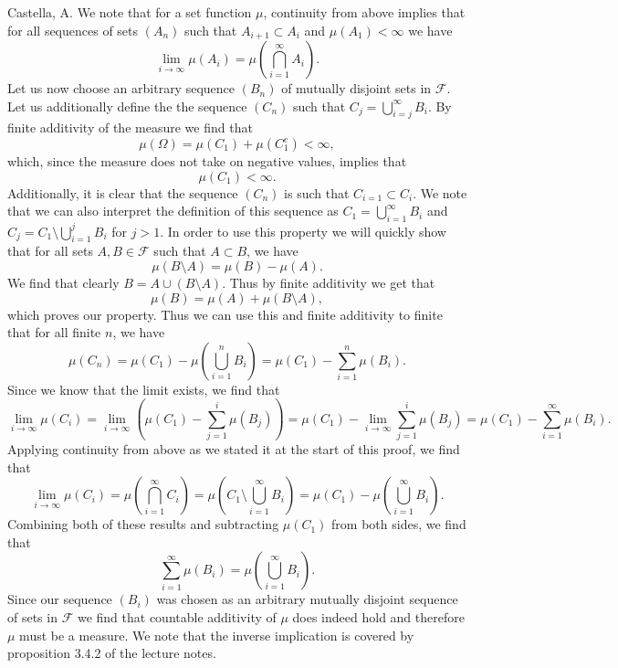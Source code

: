 \begin{solution}[3.15]{Castella, A.}
    We note that for a set function $\mu$, continuity from above implies that for all sequences of sets $(A_n)$ such that $A_{i+1} \subset A_i$ and $\mu(A_1) < \infty$ we have
    $$
        \lim_{i\rightarrow\infty}\mu(A_i) = \mu\left(\bigcap_{i=1}^\infty A_i\right).
    $$
    Let us now choose an arbitrary sequence $(B_n)$ of mutually disjoint sets in $\mathcal{F}$. Let us additionally define the the sequence $(C_n)$ such that $C_j = \bigcup_{i=j}^\infty B_i$. By finite additivity of the measure we find that
    $$
        \mu(\Omega) = \mu(C_1) + \mu(C_1^c) < \infty,
    $$
    which, since the measure does not take on negative values, implies that
    $$
        \mu(C_1) < \infty.
    $$
    Additionally, it is clear that the sequence $(C_n)$ is such that $C_{i=1} \subset C_{i}$. We note that we can also interpret the definition of this sequence as $C_1 = \bigcup_{i=1}^\infty B_i$ and $C_j = C_1 \setminus \bigcup_{i=1}^j B_i$ for $j > 1$. In order to use this property we will quickly show that for all sets $A,B \in \mathcal{F}$ such that $A \subset B$, we have
    $$
        \mu(B\setminus A) = \mu(B) - \mu(A).
    $$
    We find that clearly $B = A \cup (B\setminus A)$. Thus by finite additivity we get that
    $$
        \mu(B) = \mu(A) + \mu(B\setminus A),
    $$
    which proves our property. Thus we can use this and finite additivity to finite that for all finite $n$, we have
    $$
        \mu(C_n) = \mu(C_1) - \mu\left(\bigcup_{i=1}^n B_i\right) = \mu(C_1) - \sum_{i=1}^n\mu(B_i).
    $$
    Since we know that the limit exists, we find that
    $$
        \lim_{i\rightarrow\infty}\mu(C_i) = \lim_{i\rightarrow\infty}\left(\mu(C_1) - \sum_{j=1}^i \mu(B_j)\right) = \mu(C_1) - \lim_{i\rightarrow\infty}\sum_{j=1}^i\mu(B_j) = \mu(C_1) - \sum_{i=1}^\infty \mu(B_i).
    $$
    Applying continuity from above as we stated it at the start of this proof, we find that
    $$
        \lim_{i\rightarrow\infty}\mu(C_i) = \mu\left(\bigcap_{i=1}^\infty C_i\right) = \mu\left(C_1\setminus \bigcup_{i=1}^\infty B_i\right) = \mu(C_1) - \mu\left(\bigcup_{i=1}^\infty B_i\right).
    $$
    Combining both of these results and subtracting $\mu(C_1)$ from both sides, we find that
    $$
        \sum_{i=1}^\infty \mu(B_i) = \mu\left(\bigcup_{i=1}^\infty B_i\right).
    $$
    Since our sequence $(B_i)$ was chosen as an arbitrary mutually disjoint sequence of sets in $\mathcal{F}$ we find that countable additivity of $\mu$ does indeed hold and therefore $\mu$ must be a measure. We note that the inverse implication is covered by proposition 3.4.2 of the lecture notes.
\end{solution}

